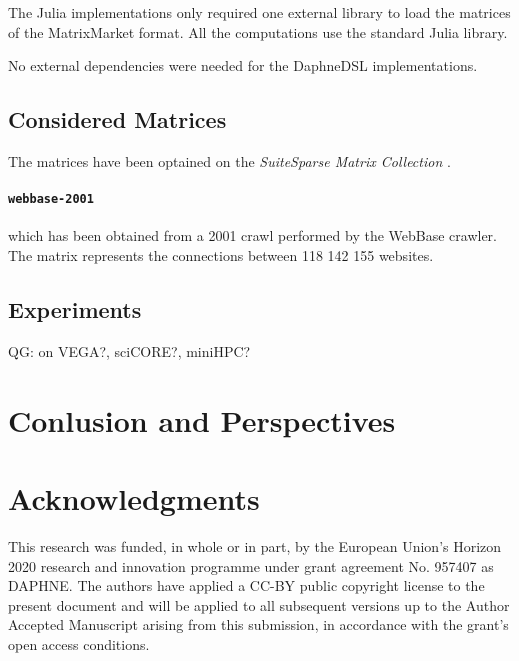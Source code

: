 \documentclass[conference,10pt,a4paper]{IEEEtran}
\newcommand{\qg}[1]{{\color{blue} QG: #1}} %
\begin{document}
The Julia implementations only required one external library to load the matrices of the MatrixMarket format.
All the computations use the standard Julia library. 

No external dependencies were needed for the DaphneDSL implementations.

\subsection{Considered Matrices}

The matrices have been optained on the \textit{SuiteSparse Matrix Collection} \cite{davis2011university}. 

\paragraph{\texttt{webbase-2001} \cite{BoVWFI, BRSLLP}}
which has been obtained from a 2001 crawl performed by the WebBase crawler.
The matrix represents the connections between 118 142 155 websites.



\subsection{Experiments}

\qg{on VEGA?, sciCORE?, miniHPC?}

\section{Conlusion and Perspectives}

\section*{Acknowledgments}

This research was funded, in whole or in part, by the European Union’s Horizon 2020 research and innovation programme under grant agreement No. 957407 as DAPHNE.
The authors have applied a CC-BY public copyright license to the present document and will be applied to all subsequent versions up to the Author Accepted Manuscript arising from this submission, in accordance with the grant’s open access conditions.

\printbibliography
\end{document}
